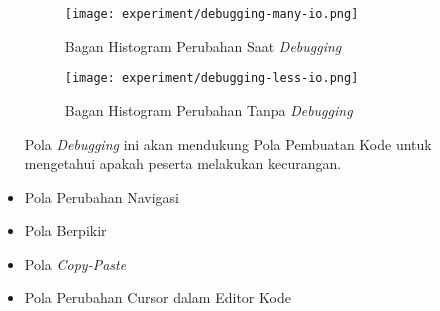 \begin{itemize}
    \begin{figure}[H]
        \centering
        \texttt{[image: experiment/debugging-many-io.png]}
        \caption{Bagan Histogram Perubahan Saat \textit{Debugging}}
        \label{fig:5:2:3:debugmany}
    \end{figure}

    \begin{figure}[H]
        \centering
        \texttt{[image: experiment/debugging-less-io.png]}
        \caption{Bagan Histogram Perubahan Tanpa \textit{Debugging}}
        \label{fig:5:2:3:debugless}
    \end{figure}

    Pola \textit{Debugging} ini akan mendukung Pola Pembuatan Kode untuk mengetahui apakah peserta melakukan kecurangan.

    \item Pola Perubahan Navigasi \\
    \item Pola Berpikir
    \item Pola \textit{Copy-Paste}
    \item Pola Perubahan Cursor dalam Editor Kode
\end{itemize}